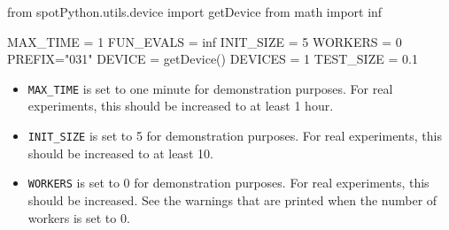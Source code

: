 \documentclass[
  letterpaper,
  DIV=11,
  numbers=noendperiod]{scrreprt}
\newenvironment{Shaded}{\begin{snugshade}}{\end{snugshade}}
\newcommand{\DecValTok}[1]{\textcolor[rgb]{0.68,0.00,0.00}{#1}}
\newcommand{\FloatTok}[1]{\textcolor[rgb]{0.68,0.00,0.00}{#1}}
\newcommand{\ImportTok}[1]{\textcolor[rgb]{0.00,0.46,0.62}{#1}}
\newcommand{\NormalTok}[1]{\textcolor[rgb]{0.00,0.23,0.31}{#1}}
\newcommand{\OperatorTok}[1]{\textcolor[rgb]{0.37,0.37,0.37}{#1}}
\newcommand{\StringTok}[1]{\textcolor[rgb]{0.13,0.47,0.30}{#1}}
\providecommand{\tightlist}{%
  \setlength{\itemsep}{0pt}\setlength{\parskip}{0pt}}\usepackage{longtable,booktabs,array}
\begin{document}
\begin{Shaded}
\begin{Highlighting}[]
\ImportTok{from}\NormalTok{ spotPython.utils.device }\ImportTok{import}\NormalTok{ getDevice}
\ImportTok{from}\NormalTok{ math }\ImportTok{import}\NormalTok{ inf}

\NormalTok{MAX\_TIME }\OperatorTok{=} \DecValTok{1}
\NormalTok{FUN\_EVALS }\OperatorTok{=}\NormalTok{ inf}
\NormalTok{INIT\_SIZE }\OperatorTok{=} \DecValTok{5}
\NormalTok{WORKERS }\OperatorTok{=} \DecValTok{0}
\NormalTok{PREFIX}\OperatorTok{=}\StringTok{"031"}
\NormalTok{DEVICE }\OperatorTok{=}\NormalTok{ getDevice()}
\NormalTok{DEVICES }\OperatorTok{=} \DecValTok{1}
\NormalTok{TEST\_SIZE }\OperatorTok{=} \FloatTok{0.1}
\end{Highlighting}
\end{Shaded}

\begin{tcolorbox}[enhanced jigsaw, rightrule=.15mm, coltitle=black, title=\textcolor{quarto-callout-caution-color}{\faFire}\hspace{0.5em}{Caution: Run time and initial design size should be increased for real
experiments}, opacitybacktitle=0.6, bottomrule=.15mm, opacityback=0, left=2mm, colback=white, leftrule=.75mm, colframe=quarto-callout-caution-color-frame, colbacktitle=quarto-callout-caution-color!10!white, toprule=.15mm, toptitle=1mm, bottomtitle=1mm, titlerule=0mm, breakable, arc=.35mm]

\begin{itemize}
\tightlist
\item
  \texttt{MAX\_TIME} is set to one minute for demonstration purposes.
  For real experiments, this should be increased to at least 1 hour.
\item
  \texttt{INIT\_SIZE} is set to 5 for demonstration purposes. For real
  experiments, this should be increased to at least 10.
\item
  \texttt{WORKERS} is set to 0 for demonstration purposes. For real
  experiments, this should be increased. See the warnings that are
  printed when the number of workers is set to 0.
\end{itemize}

\end{tcolorbox}
\end{document}
